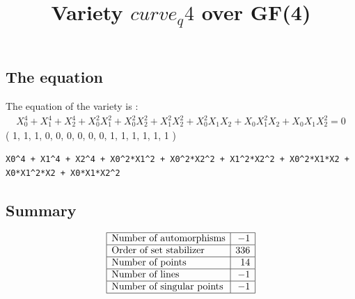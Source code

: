 \documentclass{article}
\newcommand\setTBstruts{\def\T{\rule{0pt}{2.6ex}}%
\def\B{\rule[-1.2ex]{0pt}{0pt}}}
\begin{document}
 
\setTBstruts



{\allowdisplaybreaks%






\title{Variety $curve_q4$ over GF(4)}
\author{}%
\maketitle%
%



\subsection*{The equation}
The equation of the variety  is :
{\renewcommand{\arraystretch}{1.5}
$$
\begin{array}{c}
X_0^4 + X_1^4 + X_2^4 + X_0^2X_1^2 + X_0^2X_2^2 + X_1^2X_2^2 + X_0^2X_1X_2 + X_0X_1^2X_2 + X_0X_1X_2^2=0
\end{array}
$$}
( 1, 1, 1, 0, 0, 0, 0, 0, 0, 1, 1, 1, 1, 1, 1 )\\
\begin{verbatim}
X0^4 + X1^4 + X2^4 + X0^2*X1^2 + X0^2*X2^2 + X1^2*X2^2 + X0^2*X1*X2 + X0*X1^2*X2 + X0*X1*X2^2
\end{verbatim}
\subsection*{Summary}
{\renewcommand{\arraystretch}{1.5}
$$
\begin{array}{|l|r|}
\hline
\mbox{Number of automorphisms} & -1\\
\hline
\mbox{Order of set stabilizer} & 336\\
\hline
\mbox{Number of points} & 14\\
\hline
\mbox{Number of lines} & -1 \\
\hline
\mbox{Number of singular points} & -1\\
\hline
\end{array}
$$}
}
\end{document}
